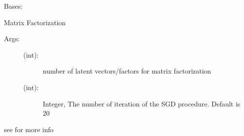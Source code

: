 \documentclass[letterpaper,10pt,english,openany,oneside]{sphinxmanual}
\begin{document}
\begin{fulllineitems}
\label{\detokenize{stl:methods.matrix_factorization.MF.SVD_MF}}
Bases: 

Matrix Factorization
\begin{description}
\item[{Args:}] \leavevmode\begin{description}
\item[{ (int): }] \leavevmode
number of latent vectors/factors for matrix factorization

\item[{ (int): }] \leavevmode
Integer, The number of iteration of the SGD procedure. Default is 20

\end{description}

\end{description}

see  for more info

\end{fulllineitems}

\end{document}

